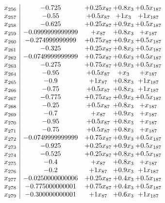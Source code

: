 \documentclass[11pt]{article}
\begin{document}
\[\begin{array}{c| c c@{\hskip 2pt} c@{\hskip 2pt} c@{\hskip 2pt} }
 x_{256}   &  -0.725 & + 0.25 x_{87} & + 0.8 x_{3} & + 0.5 x_{187}\\
 x_{257}   &  -0.55 & + 0.5 x_{87} & + 1 x_{3} & + 1 x_{187}\\
 x_{258}   &  -0.625 & + 0.25 x_{87} & + 0.9 x_{3} & + 0.5 x_{187}\\
 x_{259}   &  -0.0999999999999 & +  x_{87} & + 0.8 x_{3} & +  x_{187}\\
 x_{260}   &  -0.274999999999 & + 0.75 x_{87} & + 0.9 x_{3} & + 0.5 x_{187}\\
 x_{261}   &  -0.325 & + 0.25 x_{87} & + 0.8 x_{3} & + 0.5 x_{187}\\
 x_{262}   &  -0.0749999999999 & + 0.75 x_{87} & + 0.6 x_{3} & + 0.5 x_{187}\\
 x_{263}   &  -0.275 & + 0.75 x_{87} & + 0.9 x_{3} & + 0.5 x_{187}\\
 x_{264}   &  -0.95 & + 0.5 x_{87} & +  x_{3} & +  x_{187}\\
 x_{265}   &  -0.9 & + 1 x_{87} & + 0.8 x_{3} & + 1 x_{187}\\
 x_{266}   &  -0.75 & + 0.5 x_{87} & + 0.8 x_{3} & + 1 x_{187}\\
 x_{267}   &  -0.775 & + 0.75 x_{87} & + 0.9 x_{3} & + 0.5 x_{187}\\
 x_{268}   &  -0.25 & + 0.5 x_{87} & + 0.8 x_{3} & +  x_{187}\\
 x_{269}   &  -0.7 & +  x_{87} & + 0.9 x_{3} & +  x_{187}\\
 x_{270}   &  -0.95 & + 0.5 x_{87} & + 0.8 x_{3} & +  x_{187}\\
 x_{271}   &  -0.75 & + 0.5 x_{87} & + 0.8 x_{3} & +  x_{187}\\
 x_{272}   &  -0.0749999999999 & + 0.75 x_{87} & + 0.9 x_{3} & + 0.5 x_{187}\\
 x_{273}   &  -0.925 & + 0.25 x_{87} & + 0.9 x_{3} & + 0.5 x_{187}\\
 x_{274}   &  -0.525 & + 0.25 x_{87} & + 0.8 x_{3} & + 0.5 x_{187}\\
 x_{275}   &  -0.4 & +  x_{87} & + 0.8 x_{3} & +  x_{187}\\
 x_{276}   &  -0.2 & + 1 x_{87} & + 0.9 x_{3} & + 1 x_{187}\\
 x_{277}   &  -0.0250000000006 & + 0.25 x_{87} & + 0.4 x_{3} & + 0.5 x_{187}\\
 x_{278}   &  -0.775000000001 & + 0.75 x_{87} & + 0.4 x_{3} & + 0.5 x_{187}\\
 x_{279}   &  -0.300000000001 & + 1 x_{87} & + 0.6 x_{3} & + 1 x_{187}\\

\end{array}\]
\end{document}
